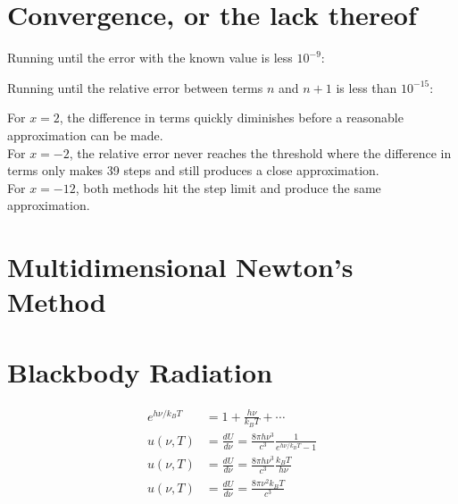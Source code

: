 \documentclass[12pt]{article}
\begin{document}
  \clearpage
  
  \section{Convergence, or the lack thereof}

  

  
  Running until the error with the known value is less $10^{-9}$:
  
  
  Running until the relative error between terms $n$ and $n+1$ is less than $10^{-15}$:
  


  For $x=2$, the difference in terms quickly diminishes before a reasonable
  approximation can be made.
  \\
  For $x=-2$, the relative error never reaches the threshold where the 
  difference in terms only makes 39 steps and still produces a close
  approximation.
  \\
  For $x=-12$, both methods hit the step limit and produce the same approximation.
  

  \clearpage

  \section{Multidimensional Newton's Method}

  \clearpage

  \section{Blackbody Radiation}
  
  \begin{align} 
    e^{h\nu / k_B T} &= 1 + \frac{h \nu}{k_B T} + \cdots \nonumber \\
    u(\nu, T) &= \frac{dU}{d\nu} =
    \frac{8\pi h \nu^3}{c^3}\frac{1}{e^{h\nu/k_B T}-1} \nonumber \\
    u(\nu, T) &= \frac{dU}{d\nu}  =
      \frac{8\pi h \nu^3}{c^3}\frac{k_B T}{h \nu} \nonumber \\
    \label{eq:nu}
    u(\nu, T) &= \frac{dU}{d\nu}  =
      \frac{8\pi \nu^2 k_B T}{c^3 }
  \end{align}
\end{document}

